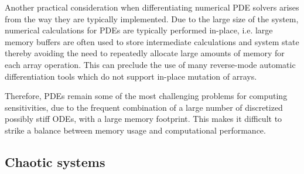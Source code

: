 Another practical consideration when differentiating numerical PDE solvers arises from the way they are typically implemented. 
Due to the large size of the system, numerical calculations for PDEs are typically performed in-place, i.e. large memory buffers are often used to store intermediate calculations and system state thereby avoiding the need to repeatedly allocate large amounts of memory for each array operation. 
This can preclude the use of many reverse-mode automatic differentiation tools which do not support in-place mutation of arrays.

Therefore, PDEs remain some of the most challenging problems for computing sensitivities, due to the frequent combination of a large number of discretized possibly stiff ODEs, with a large memory footprint. 
This makes it difficult to strike a balance between memory usage and computational performance.




\subsection{Chaotic systems}


